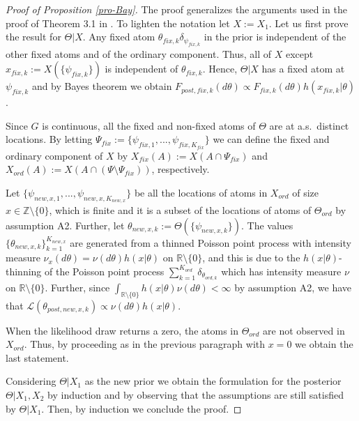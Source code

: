 \documentclass{article}
\theoremstyle{plain}
\theoremstyle{remark}
\begin{document}
\begin{proof}[Proof of Proposition \ref{pro-Bay}]
	The proof generalizes the arguments used in the proof of Theorem 3.1 in \cite{Bro1}. To lighten the notation let $X:=X_1$. Let us first prove the result for $\Theta|X$. Any fixed atom $\theta_{fix,k}\delta_{\psi_{fix,k}}$ in the prior is independent of the other fixed atoms and of the ordinary component. Thus, all of $X$ except $x_{fix,k}:=X(\{\psi_{fix,k}\})$ is independent of $\theta_{fix,k}$. Hence, $\Theta|X$ has a fixed atom at $\psi_{fix,k}$ and by Bayes theorem we obtain $F_{post,fix,k}(d\theta)\varpropto F_{fix,k}(d\theta)h(x_{fix,k}|\theta)$.
	
	Since $G$ is continuous, all the fixed and non-fixed atoms of $\Theta$ are at a.s.~distinct locations. By letting $\Psi_{fix}:=\{\psi_{fix,1},...,\psi_{fix,K_{fix}}\}$ we can define the fixed and ordinary component of $X$ by $X_{fix}(A):=X(A\cap \Psi_{fix})$ and $X_{ord}(A):=X(A\cap (\Psi\setminus\Psi_{fix}))$, respectively.
	
	Let $\{\psi_{new,x,1},...,\psi_{new,x,K_{new,x}}\}$ be all the locations of atoms in $X_{ord}$ of size $x\in\mathbb{Z}\setminus\{0\}$, which is finite and it is a subset of the locations of atoms of $\Theta_{ord}$ by assumption A2. Further, let $\theta_{new,x,k}:=\Theta(\{\psi_{new,x,k}\})$. The values $\{\theta_{new,x,k} \}_{k=1}^{K_{new,x}}$ are generated from a thinned Poisson point process with intensity measure $\nu_{x}(d\theta)=\nu(d\theta)h(x|\theta)$ on $\mathbb{R}\setminus\{0\}$, and this is due to the $h(x|\theta)$-thinning of the Poisson point process $\sum_{k=1}^{K_{ord}}\delta_{\theta_{ord,k}}$ which has intensity measure $\nu$ on $\mathbb{R}\setminus\{0\}$. Further, since $\int_{\mathbb{R}\setminus\{0\}}h(x|\theta)\nu(d\theta)<\infty$ by assumption A2, we have that $\mathcal{L}(\theta_{post,new,x,k})\varpropto\nu(d\theta)h(x|\theta)$.
	
	When the likelihood draw returns a zero, the atoms in $\Theta_{ord}$ are not observed in $X_{ord}$. Thus, by proceeding as in the previous paragraph with $x=0$ we obtain the last statement.
	
	Considering $\Theta|X_{1}$ as the new prior we obtain the formulation for the posterior $\Theta|X_{1},X_{2}$ by induction and by observing that the assumptions are still satisfied by $\Theta|X_{1}$. Then, by induction we conclude the proof.
\end{proof}
\end{document}
